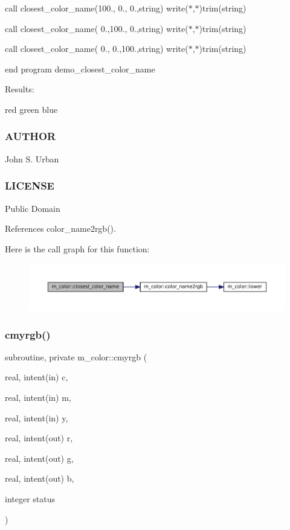 call closest\+\_\+color\+\_\+name(100., 0., 0.,string) write($\ast$,$\ast$)trim(string)

call closest\+\_\+color\+\_\+name( 0.,100., 0.,string) write($\ast$,$\ast$)trim(string)

call closest\+\_\+color\+\_\+name( 0., 0.,100.,string) write($\ast$,$\ast$)trim(string)

end program demo\+\_\+closest\+\_\+color\+\_\+name

Results\+:

red green blue

\subsubsection*{A\+U\+T\+H\+OR}

John S. Urban

\subsubsection*{L\+I\+C\+E\+N\+SE}

Public Domain 

References color\+\_\+name2rgb().

Here is the call graph for this function\+:\nopagebreak
\begin{figure}[H]
\begin{center}
\leavevmode
\includegraphics[width=350pt]{namespacem__color_acad72628ee0b77cf87f40cd46734fb18_cgraph}
\end{center}
\end{figure}
\mbox{\label{namespacem__color_ab91687e87d0901874e52efe5933e3044}} 
\subsubsection{\texorpdfstring{cmyrgb()}{cmyrgb()}}
{\footnotesize\ttfamily subroutine, private m\+\_\+color\+::cmyrgb (\begin{DoxyParamCaption}\item[{real, intent(in)}]{c,  }\item[{real, intent(in)}]{m,  }\item[{real, intent(in)}]{y,  }\item[{real, intent(out)}]{r,  }\item[{real, intent(out)}]{g,  }\item[{real, intent(out)}]{b,  }\item[{integer}]{status }\end{DoxyParamCaption})\hspace{0.3cm}{\ttfamily [private]}}


